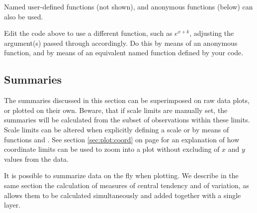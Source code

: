 \documentclass[krantz2]{krantz}\usepackage{knitr}
\begin{document}
Named user-defined functions (not shown), and anonymous functions (below) can also be used.

\begin{knitrout}\footnotesize
{}\color{fgcolor}\begin{kframe}
\begin{alltt}
\hlstd{(}\hlstd{(} \hlstd{=} \hlopt{:}\hlstd{),} \hlstd{(}  \hlopt{+}
  \hlstd{(} \hlstd{=} \hlstd{(}\hlstd{,} \hlstd{,}  \hlopt{+}  \hlopt{*} \hlopt{^}\hlstd{\},}
                 \hlstd{=} \hlstd{(} \hlstd{=} \hlstd{,}  \hlstd{=} \hlstd{))}
\end{alltt}
\end{kframe}
\end{knitrout}

\begin{playground}
Edit the code above to use a different function, such as $e^{x + k}$, adjusting the argument(s) passed through  accordingly. Do this by means of an anonymous function, and by means of an equivalent named function defined by your code.
\end{playground}


\subsection{Summaries}\label{sec:plot:stat:summaries}
The summaries discussed in this section can be superimposed on raw data plots, or plotted on their own. Beware, that if scale limits are manually set, the summaries will be calculated from the subset of observations within these limits. Scale limits can be altered when explicitly defining a scale or by means of functions  and . See section \ref{sec:plot:coord} on page \pageref{sec:plot:coord} for an explanation of how coordinate limits can be used to zoom into a plot without excluding of $x$ and $y$ values from the data.

It is possible to summarize data on the fly when plotting. We describe in the same section the calculation of measures of central tendency and of variation, as  allows them to be calculated simultaneously and added together with a single layer.
\end{document}
